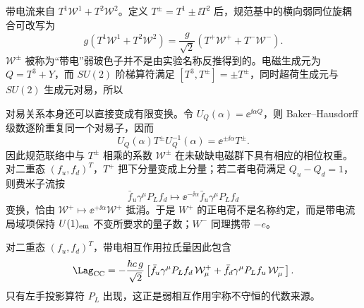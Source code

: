 \begin{proposition}
带电流来自 $T^1\mathcal W^1+T^2\mathcal W^2$。定义 $T^\pm=T^1\pm\ii T^2$ 后，规范基中的横向弱同位旋耦合可改写为
\begin{equation}
{
 g(T^1\mathcal W^1+T^2\mathcal W^2)
 =\frac g{\sqrt2}
 \left(T^+\mathcal W^++T^-\mathcal W^-\right).}
\label{eq:sm-charged-generator-dp68}
\end{equation}
$\mathcal W^\pm$ 被称为“带电”弱玻色子并不是由实验名称反推得到的。电磁生成元为 $Q=T^3+Y$，而 $SU(2)$ 阶梯算符满足 $[T^3,T^\pm]=\pm T^\pm$，同时超荷生成元与 $SU(2)$ 生成元对易，所以

对易关系本身还可以直接变成有限变换。令 $U_Q(\alpha)=\ee^{\ii\alpha Q}$，则 Baker--Hausdorff 级数逐阶重复同一个对易子，因而
\begin{equation*}
U_Q(\alpha)T^\pm U_Q^{-1}(\alpha)
=\ee^{\pm\ii\alpha}T^\pm.
\end{equation*}
因此规范联络中与 $T^\pm$ 相乘的系数 $\mathcal W^\pm$ 在未破缺电磁群下具有相应的相位权重。对二重态 $(f_u,f_d)^T$，$T^+$ 把下分量变成上分量；若二者电荷满足 $Q_u-Q_d=1$，则费米子流按
\begin{equation*}
\bar f_u\gamma^\mu P_L f_d
\longmapsto
\ee^{-\ii\alpha}\bar f_u\gamma^\mu P_L f_d
\end{equation*}
变换，恰由 $\mathcal W^+\mapsto\ee^{+\ii\alpha}\mathcal W^+$ 抵消。于是 $W^+$ 的正电荷不是名称约定，而是带电流局域项保持 $U(1)_{\rm em}$ 不变所要求的量子数；$W^-$ 同理携带 $-e$。

对二重态 $(f_u,f_d)^T$，带电相互作用拉氏量因此包含
\begin{equation}
 {
 \Lag_{\rm CC}
 =-\frac{\hbar c\,g}{\sqrt2}
 \left[
 \bar f_u\gamma^\mu P_L f_d\,\mathcal W_\mu^+
 +\bar f_d\gamma^\mu P_L f_u\,\mathcal W_\mu^-
 \right].}
 \label{eq:sm-charged-current-preflavor-dp11}
\end{equation}
只有左手投影算符 $P_L$ 出现，这正是弱相互作用宇称不守恒的代数来源。
\end{proposition}


